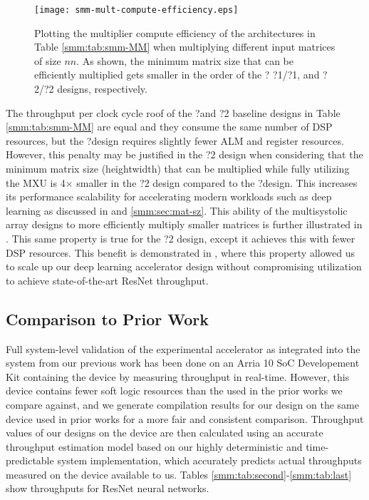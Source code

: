 \begin{figure}[]
  \hspace*{-0.25cm}
  \centering
  \texttt{[image: smm-mult-compute-efficiency.eps]}
  \vspace*{-0.6cm}
  \caption{Plotting the multiplier compute efficiency of the architectures in Table \ref{smm:tab:smm-MM} when multiplying different input matrices of size $n$\by$n$.
    As shown, the minimum matrix size that can be efficiently multiplied gets smaller in the order of the \mm?\zero{,} \mm?1{/}\smm?1{,} and \mm?2{/}\smm?2 designs, respectively.}
  \label{smm:fig:perf}
\end{figure}

The throughput per clock cycle roof of the \mm?\zero and \mm?2 baseline designs in Table \ref{smm:tab:smm-MM} are equal and they consume the same number of DSP resources, but the \mm?\zero design requires slightly fewer ALM and register resources.
However, this penalty may be justified in the \mm?2 design when considering that the minimum matrix size (height\by width) that can be multiplied while fully utilizing the MXU is 4$\times$ smaller in the \mm?2 design compared to the \mm?\zero design.
This increases its performance scalability for accelerating modern workloads such as deep learning as discussed in  and \ref{smm:sec:mat-sz}.
This ability of the multisystolic array designs to more efficiently multiply smaller matrices is further illustrated in .
This same property is true for the \smmArch?2 design, except it achieves this with fewer DSP resources.
This benefit is demonstrated in , where this property allowed us to scale up our deep learning accelerator design without compromising utilization to achieve state-of-the-art ResNet throughput.


\subsection{Comparison to Prior Work}
\label{smm:sec:results-prior-work}

Full system-level validation of the experimental accelerator as integrated into the system from our previous work \cite{pogue2024fast} has been done on an Arria 10 SoC Developement Kit \cite{sx-dev-kit} containing the \sx device by measuring throughput in real-time.
However, this device contains fewer soft logic resources than the \gx used in the prior works we compare against, and we generate compilation results for our design on the same \gx device used in prior works for a more fair and consistent comparison.
Throughput values of our designs on the \gx device are then calculated using an accurate throughput estimation model based on our highly deterministic and time-predictable system implementation, which accurately predicts actual throughputs measured on the \sx device available to us.
Tables \ref{smm:tab:second}-\ref{smm:tab:last} show throughputs for ResNet \cite{kaiming2016deep} neural networks.

